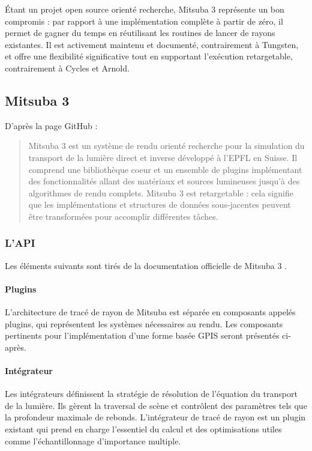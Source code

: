 Étant un projet open source orienté recherche, Mitsuba 3 représente un bon compromis : par rapport à une implémentation complète à partir de zéro, il permet de gagner du temps en réutilisant les routines de lancer de rayons existantes. Il est activement maintenu et documenté, contrairement à Tungsten, et offre une flexibilité significative tout en supportant l'exécution retargetable, contrairement à Cycles et Arnold.

\subsection{Mitsuba 3}

D'après la page GitHub :
\begin{quote}
Mitsuba 3 est un système de rendu orienté recherche pour la simulation du transport de la lumière direct et inverse développé à l'EPFL en Suisse. Il comprend une bibliothèque coeur et un ensemble de plugins implémentant des fonctionnalités allant des matériaux et sources lumineuses jusqu'à des algorithmes de rendu complets. Mitsuba 3 est retargetable : cela signifie que les implémentations et structures de données sous-jacentes peuvent être transformées pour accomplir différentes tâches. \cite{Mitsuba3}
\end{quote}

\subsubsection{L'API}
Les éléments suivants sont tirés de la documentation officielle de Mitsuba 3 \cite{Mitsuba3}.

\paragraph{Plugins}
L'architecture de tracé de rayon de Mitsuba est séparée en composants appelés plugins, qui représentent les systèmes nécessaires au rendu. Les composants pertinents pour l'implémentation d'une forme basée GPIS seront présentés ci-après.

\paragraph{Intégrateur}
Les intégrateurs définissent la stratégie de résolution de l'équation du transport de la lumière. Ils gèrent la traversal de scène et contrôlent des paramètres tels que la profondeur maximale de rebonds. L'intégrateur de tracé de rayon est un plugin existant qui prend en charge l'essentiel du calcul et des optimisations utiles comme l'échantillonnage d'importance multiple.

